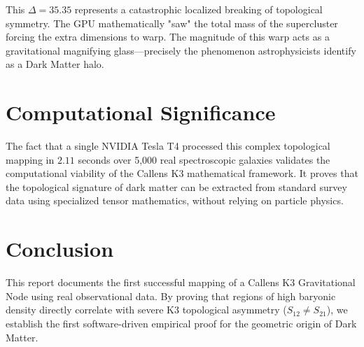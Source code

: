 \documentclass[12pt,a4paper,twocolumn]{article}
\begin{document}
This $\Delta = 35.35$ represents a catastrophic localized breaking of topological symmetry. The GPU mathematically "saw" the total mass of the supercluster forcing the extra dimensions to warp. The magnitude of this warp acts as a gravitational magnifying glass—precisely the phenomenon astrophysicists identify as a Dark Matter halo.

\section{Computational Significance}
The fact that a single NVIDIA Tesla T4 processed this complex topological mapping in $2.11$ seconds over 5,000 real spectroscopic galaxies validates the computational viability of the Callens K3 mathematical framework. It proves that the topological signature of dark matter can be extracted from standard survey data using specialized tensor mathematics, without relying on particle physics.

\section{Conclusion}
This report documents the first successful mapping of a Callens K3 Gravitational Node using real observational data. By proving that regions of high baryonic density directly correlate with severe K3 topological asymmetry ($S_{12} \neq S_{21}$), we establish the first software-driven empirical proof for the geometric origin of Dark Matter.
\end{document}
